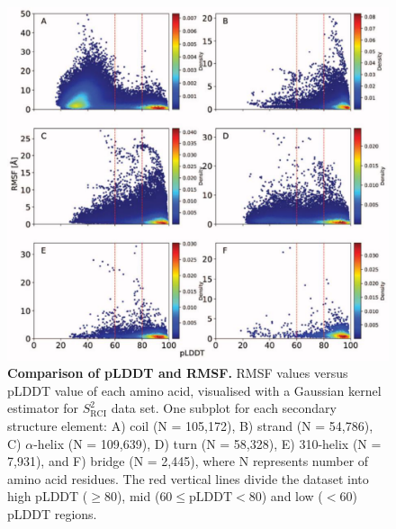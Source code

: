 \begin{figure}[H]
    \centering
    \includegraphics[width=\linewidth]{pLDDT//plddt_figures//supplementary_bhawna/supfig16.pdf}
    \caption{\textbf{Comparison of pLDDT and RMSF.} RMSF values versus pLDDT value of each amino acid, visualised with a Gaussian kernel estimator for $S_{\text{RCI}}^{2}$ data set. One subplot for each secondary structure element: A) coil (N = 105,172), B) strand (N = 54,786), C) $\alpha$-helix (N = 109,639), D) turn (N = 58,328), E) 310-helix (N = 7,931), and F) bridge (N = 2,445), where N represents number of amino acid residues. The red vertical lines divide the dataset into high pLDDT ($\geq 80$), mid ($60 \leq \text{pLDDT} < 80$) and low ($< 60$) pLDDT regions.}
    \label{fig:plddt_sup:sup16}
\end{figure}



